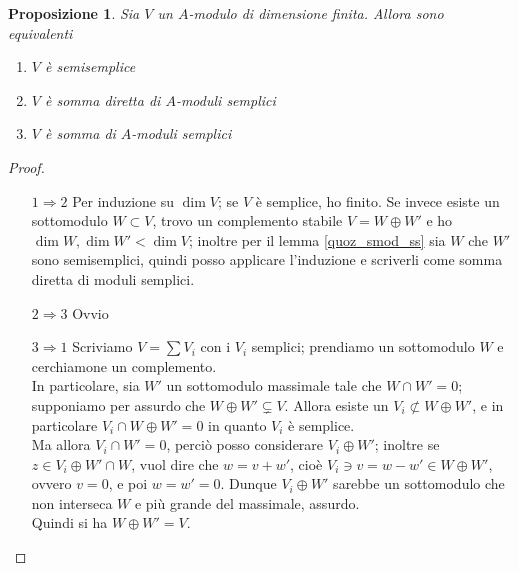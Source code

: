 \documentclass[11pt]{article}
\theoremstyle{plain}
\newtheorem{prop}[thm]{Proposizione}
\theoremstyle{definition}
\theoremstyle{remark}
\begin{document}
  \begin{prop}
   Sia $V$ un $A$-modulo di dimensione finita. Allora sono equivalenti
   \begin{enumerate}
    \item $V$ è semisemplice
    \item $V$ è somma diretta di $A$-moduli semplici
    \item $V$ è somma di $A$-moduli semplici
   \end{enumerate}
  \end{prop}
  \begin{proof}$ $
    \begin{itemize}
     \item[$1\Rightarrow2$] Per induzione su $\dim V$; se $V$ è semplice, ho finito. Se invece esiste un sottomodulo $W\subset V$, trovo un complemento stabile $V=W\oplus W'$ e ho $\dim W,\dim W'<\dim V$; inoltre per il lemma \ref{quoz_smod_ss} sia $W$ che $W'$ sono semisemplici, quindi posso applicare l'induzione e scriverli come somma diretta di moduli semplici.
     \item[$2\Rightarrow3$] Ovvio
     \item[$3\Rightarrow1$] Scriviamo $V=\sum V_i$ con i $V_i$ semplici; prendiamo un sottomodulo $W$ e cerchiamone un complemento.\\
     In particolare, sia $W'$ un sottomodulo massimale tale che $W\cap W'=0$; supponiamo per assurdo che $W\oplus W'\subsetneq V$.
     Allora esiste un $V_i\not\subset W\oplus W'$, e in particolare $V_i\cap W\oplus W'=0$ in quanto $V_i$ è semplice.\\
     Ma allora $V_i\cap W'=0$, perciò posso considerare $V_i\oplus W'$; inoltre se $z\in V_i\oplus W'\cap W$, vuol dire che $w=v+w'$, cioè $V_i\ni v=w-w'\in W\oplus W'$, ovvero $v=0$, e poi $w=w'=0$. Dunque $V_i\oplus W'$ sarebbe un sottomodulo che non interseca $W$ e più grande del massimale, assurdo.\\
     Quindi si ha $W\oplus W'=V$.
    \end{itemize}
   \end{proof}
   
\end{document}
